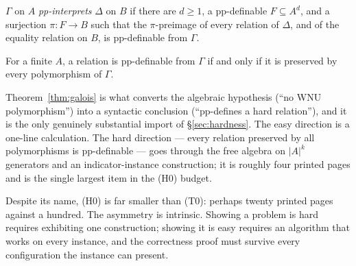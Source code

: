 \begin{definition}[pp-interpretation]\label{def:pp-interp}
$\Gamma$ on $A$ \emph{pp-interprets} $\Delta$ on $B$ if there are $d\ge 1$, a
pp-definable $F\subseteq A^{d}$, and a surjection $\pi\colon F\to B$ such that
the $\pi$-preimage of every relation of $\Delta$, and of the equality relation
on $B$, is pp-definable from $\Gamma$.
\end{definition}

\begin{theorem}\label{thm:galois}
For a finite $A$, a relation is pp-definable from $\Gamma$ if and only if it is
preserved by every polymorphism of $\Gamma$.
\end{theorem}

\begin{hazard}\label{haz:galois}
Theorem~\ref{thm:galois} is what converts the algebraic hypothesis (``no WNU
polymorphism'') into a syntactic conclusion (``pp-defines a hard relation''),
and it is the only genuinely substantial import of \S\ref{sec:hardness}. The
easy direction is a one-line calculation. The hard direction --- every relation
preserved by all polymorphisms is pp-definable --- goes through the free algebra
on $|A|^{k}$ generators and an indicator-instance construction; it is roughly
four printed pages and is the single largest item in the \textup{(H0)} budget.
\end{hazard}

\begin{remark}\label{rem:hardness-easier}
Despite its name, \textup{(H0)} is far smaller than \textup{(T0)}: perhaps
twenty printed pages against a hundred. The asymmetry is intrinsic. Showing a
problem is hard requires exhibiting one construction; showing it is easy
requires an algorithm that works on every instance, and the correctness proof
must survive every configuration the instance can present.
\end{remark}
